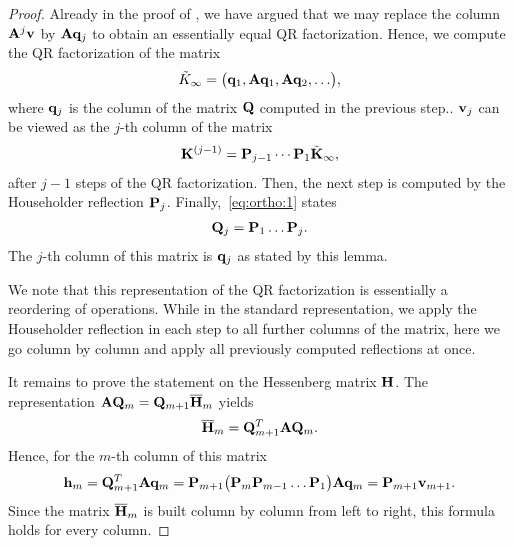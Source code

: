 \begin{proof}
  Already in the proof of , we
  have argued that we may replace the column $\mathbf A^{j}\mathbf v$ by
  $\mathbf A\mathbf q_{j}$ to obtain an essentially equal QR factorization. Hence,
  we compute the QR factorization of the matrix
  \begin{gather}
    \tilde K_\infty = \bigl(\mathbf q_1,\mathbf A\mathbf q_1,\mathbf A\mathbf q_2,\ldots\bigr),
  \end{gather}
  where $\mathbf q_j$ is the column of the matrix $\mathbf Q$ computed in the
  previous step..  $\mathbf v_j$ can be viewed as the $j$-th column of the
  matrix
  \begin{gather}
    \mathbf K^{(j-1)} = \mathbf P_{j-1}\cdots \mathbf P_1 \tilde{\mathbf K}_{\infty},
  \end{gather}
  after $j-1$ steps of the QR factorization. Then, the next step is computed by the
  Householder reflection $\mathbf P_j$. Finally,~\eqref{eq:ortho:1} states
  \begin{gather}
    \mathbf Q_j = \mathbf P_1\dots\mathbf P_j.
  \end{gather}
  The $j$-th column of this matrix is $\mathbf q_j$ as stated by
  this lemma.

  We note that this representation of the QR factorization is
  essentially a reordering of operations. While in the standard
  representation, we apply the Householder reflection in each step to
  all further columns of the matrix, here we go column by column and
  apply all previously computed reflections at once.

  It remains to prove the statement on the Hessenberg matrix
  $\mathbf H$. The representation
  $\mathbf A\mathbf Q_{m} = \mathbf Q_{m+1}\overline{\mathbf H}_{m}$ yields
  \begin{gather}
    \overline{\mathbf H}_{m} = \mathbf Q_{m+1}^T\mathbf A\mathbf Q_{m}.
  \end{gather}
  Hence, for the $m$-th column of this matrix
  \begin{gather}
    \mathbf h_m = \mathbf Q_{m+1}^T\mathbf A\mathbf q_{m} = \mathbf P_{m+1}
    \bigl(\mathbf P_{m}\mathbf P_{m-1}\dots\mathbf P_{1}\bigr)\mathbf A\mathbf q_{m}
    = \mathbf P_{m+1} \mathbf v_{m+1}.
  \end{gather}
  Since the matrix $\overline{\mathbf H}_{m}$ is built column by column from
  left to right, this formula holds for every column.
\end{proof}


